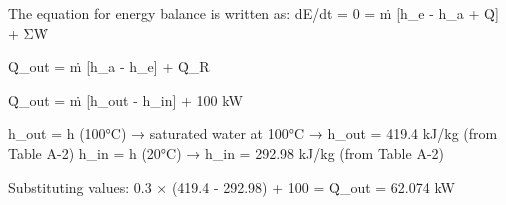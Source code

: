 The equation for energy balance is written as:  
dE/dt = 0 = ṁ [h_e - h_a + Q̇] + ΣẆ  

Q̇_out = ṁ [h_a - h_e] + Q̇_R  

Q̇_out = ṁ [h_out - h_in] + 100 kW  

h_out = h (100°C) → saturated water at 100°C → h_out = 419.4 kJ/kg (from Table A-2)  
h_in = h (20°C) → h_in = 292.98 kJ/kg (from Table A-2)  

Substituting values:  
0.3 × (419.4 - 292.98) + 100 = Q̇_out = 62.074 kW